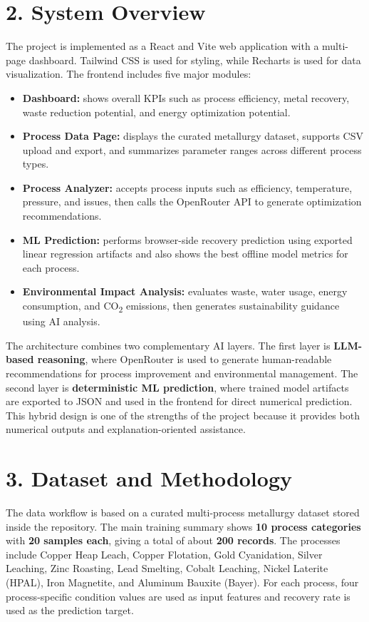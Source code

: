 \documentclass[12pt,a4paper]{article}
\begin{document}
\section*{2. System Overview}

The project is implemented as a React and Vite web application with a multi-page dashboard. Tailwind CSS is used for styling, while Recharts is used for data visualization. The frontend includes five major modules:

\begin{itemize}[leftmargin=1.2cm,itemsep=0.2em]
\item \textbf{Dashboard:} shows overall KPIs such as process efficiency, metal recovery, waste reduction potential, and energy optimization potential.
\item \textbf{Process Data Page:} displays the curated metallurgy dataset, supports CSV upload and export, and summarizes parameter ranges across different process types.
\item \textbf{Process Analyzer:} accepts process inputs such as efficiency, temperature, pressure, and issues, then calls the OpenRouter API to generate optimization recommendations.
\item \textbf{ML Prediction:} performs browser-side recovery prediction using exported linear regression artifacts and also shows the best offline model metrics for each process.
\item \textbf{Environmental Impact Analysis:} evaluates waste, water usage, energy consumption, and CO\textsubscript{2} emissions, then generates sustainability guidance using AI analysis.
\end{itemize}

The architecture combines two complementary AI layers. The first layer is \textbf{LLM-based reasoning}, where OpenRouter is used to generate human-readable recommendations for process improvement and environmental management. The second layer is \textbf{deterministic ML prediction}, where trained model artifacts are exported to JSON and used in the frontend for direct numerical prediction. This hybrid design is one of the strengths of the project because it provides both numerical outputs and explanation-oriented assistance.

\section*{3. Dataset and Methodology}

The data workflow is based on a curated multi-process metallurgy dataset stored inside the repository. The main training summary shows \textbf{10 process categories} with \textbf{20 samples each}, giving a total of about \textbf{200 records}. The processes include Copper Heap Leach, Copper Flotation, Gold Cyanidation, Silver Leaching, Zinc Roasting, Lead Smelting, Cobalt Leaching, Nickel Laterite (HPAL), Iron Magnetite, and Aluminum Bauxite (Bayer). For each process, four process-specific condition values are used as input features and recovery rate is used as the prediction target.
\end{document}
